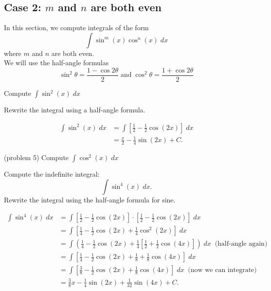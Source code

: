\documentclass{ximera}
\begin{document}
\subsection{Case 2: $m$ and $n$ are both even}
In this section, we compute integrals of the form
\[
\int \sin^m(x) \cos^n(x) \; dx
\]
where $m$ and $n$ are both even.\\
We will use the half-angle formulas
\[
\sin^2 \theta = \frac{1 - \cos 2\theta}{2} \; \text{and} \; \cos^2 \theta = \frac{1 + \cos 2\theta}{2}
\]

\begin{example}[example 5]
Compute $\displaystyle{\int \sin^2(x) \; dx}$

Rewrite the integral using a half-angle formula.

\begin{align*}
\int \sin^2(x) \; dx &= \int \left[\frac12- \frac12\cos(2x)\right]  \; dx\\
  &= \frac{x}{2}  - \frac{1}{4}\sin(2x) + C.
\end{align*}
\end{example}

\begin{problem}(problem 5)
Compute $\displaystyle{\int \cos^2(x) \; dx}$
\begin{multipleChoice}
\end{multipleChoice}
\end{problem}

\begin{example}[example 6]
Compute the indefinite integral:
\[
\int \sin^4(x) \; dx.
\]
Rewrite the integral using the half-angle formula for sine.

\begin{align*}
\int \sin^4(x) \; dx &= \int \left[\tfrac12- \tfrac12\cos(2x)\right] \cdot \left[\tfrac12 - \tfrac12\cos(2x)\right] \; dx\\
  &=  \int \left[\tfrac14 - \tfrac12\cos(2x) + \tfrac14\cos^2(2x)\right] \; dx \\
  &= \int \left( \tfrac14 - \tfrac12 \cos(2x) + \tfrac14 
  \left[\tfrac12 + \tfrac12\cos(4x)\right]\right) \; dx  \;\; \text{(half-angle again)} \\
  &= \int \left[\tfrac14 - \tfrac12 \cos(2x) +\tfrac18 + \tfrac18\cos(4x)\right] \; dx\\
  &=  \int \left[\tfrac38 - \tfrac12 \cos(2x) + \tfrac18\cos(4x)\right] \; dx \;\; \text{(now we can integrate)}\\
  &= \tfrac38 x - \tfrac14 \sin(2x) + \tfrac{1}{32}\sin(4x) + C.
\end{align*}
\end{example}
\end{document}
